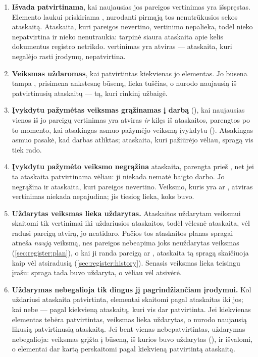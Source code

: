 \begin{enumerate}
  \item \textbf{Išvada patvirtinama}, kai naujausias jos pareigos vertinimas yra išspręstas.
    Elemento laukui  priskiriama , nurodanti pirmąją tos
    nenutrūkusios sekos ataskaitą. Ataskaita, kuri pareigos nevertino, vertinimo nepalieka, todėl
    nieko nepatvirtina ir nieko nenutraukia: tarpinė siaura ataskaita apie kelis dokumentus
    registro netrikdo.  vertinimas yra atviras --- ataskaita, kuri negalėjo rasti
    įrodymų, nepatvirtina.
  \item \textbf{Veiksmas uždaromas}, kai patvirtintas kiekvienas jo elementas. Jo būsena tampa
    ,  prisimena ankstesnę būseną,  lieka tuščias,
    o  nurodo naujausią iš patvirtinusių ataskaitų --- tą, kuri rinkinį
    užbaigė.
  \item \textbf{Įvykdytu pažymėtas veiksmas grąžinamas į darbą} (), kai
    naujausias vienos iš jo pareigų vertinimas yra atviras \emph{ir} kilęs iš ataskaitos,
    parengtos po to momento, kai atsakingas asmuo pažymėjo veiksmą įvykdytu ().
    Atsakingas asmuo pasakė, kad darbas atliktas; ataskaita, kuri pažiūrėjo vėliau, spragą vis
    tiek rado.
  \item \textbf{Įvykdytu pažymėto veiksmo negrąžina} ataskaita, parengta prieš , net
    jei ta ataskaita patvirtinama vėliau: ji niekada nematė baigto darbo. Jo negrąžina ir
    ataskaita, kuri pareigos nevertino. Veiksmo, kuris yra  ar ,
    atviras vertinimas niekada nepajudina; jis tiesiog lieka, koks buvo.
  \item \textbf{Uždarytas veiksmas lieka uždarytas.} Ataskaitos uždarytam veiksmui skaitomi tik
    vertinimai iki uždariusios ataskaitos, todėl vėlesnė ataskaita, vėl radusi pareigą atvirą, jo
    neatidaro. Pačios tos ataskaitos planas spragai atneša \emph{naują} veiksmą, nes pareigos
    nebeapima joks neuždarytas veiksmas (\cref{sec:register:plan}), o kai ji randa pareigą
     ar , ataskaita tą spragą skaičiuoja kaip vėl atsiradusią
    (\cref{sec:register:history}). Senasis veiksmas lieka teisingu įrašu: spraga tada buvo
    uždaryta, o vėliau vėl atsivėrė.
  \item \textbf{Uždarymas nebegalioja tik dingus jį pagrindžiančiam įrodymui.} Kol uždariusi ataskaita
    patvirtinta, elementai skaitomi pagal ataskaitas iki jos; kai nebe --- pagal kiekvieną
    ataskaitą, kuri vis dar patvirtinta. Jei kiekvienas elementas tebėra patvirtintas, veiksmas
    lieka uždarytas, o  nurodo naujausią likusią patvirtinusią ataskaitą.
    Jei bent vienas nebepatvirtintas, uždarymas nebegalioja: veiksmas grįžta į būseną, iš kurios buvo
    uždarytas (),  ir  išvalomi, o
    elementai dar kartą perskaitomi pagal kiekvieną patvirtintą ataskaitą.
\end{enumerate}

